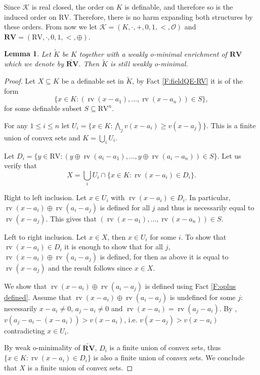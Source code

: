 \documentclass[11pt]{amsart}
\DeclareMathOperator{\rv}{rv}
\newtheorem{lemma}[theorem]{Lemma}
\theoremstyle{definition}
\newcommand{\CK}{{\mathcal K}}
\newcommand{\CO}{{\mathcal O}}
\newcommand{\0}{\emptyset}
\begin{document}
Since $\CK$ is real closed, the order on $K$ is definable, and therefore so is the induced order on $\mathrm{RV}$.  Therefore, there is no harm expanding both structures by these orders. From now we let $\CK=(K,\cdot,+,0,1,<,\CO)$ and $\mathbf{RV}=(\mathrm{RV},\cdot,0,1,<,\oplus)$.


  \begin{lemma}\label{L:Rvwom implies K wom}
      Let $\widetilde K$ be $K$ together with a weakly o-minimal enrichment of $\mathbf{RV}$ which we denote by $\widetilde{\mathbf{RV}}$. Then $\widetilde K$ is still weakly o-minimal.
  \end{lemma}
\begin{proof}
    Let $X\subseteq K$ be a definable set in $\widetilde K$, by Fact \ref{F:fieldQE-RV} it is of the form \[\{x\in K: (\rv(x-a_1),\dots, \rv(x-a_n))\in S\},\] for some definable subset $S\subseteq \mathrm{RV}^n$.

    For any $1\leq i\leq n$ let $U_{i}=\{x\in K: \bigwedge_j v(x-a_{i})\geq v(x-a_j)\}$. This is a finite union of convex sets and $K=\bigcup_i U_i$.
    
    
    Let $D_{i}=\{y\in \mathrm{RV}: (y\oplus \rv(a_{i}-a_1),\dots, y\oplus \rv(a_{i}-a_n))\in S\}$. 
    Let us verify that  
    \[X=\bigcup_{i} U_{i}\cap \{x\in K: \rv(x-a_{i})\in D_{i}\}.\]

    Right to left inclusion. Let $x\in U_i$ with $\rv(x-a_i)\in D_i$. In particular, $\rv(x-a_i)\oplus \rv(a_i-a_j)$ is defined for all $j$ and thus is necessarily equal to $\rv(x-a_j)$. This gives that $(\rv(x-a_1),\dots, \rv(x-a_n))\in S$.
    
    Left to right inclusion. Let $x\in X$, then $x\in U_{i}$ for some $i$. To show that $\rv(x-a_{i})\in D_{i}$ it is enough to show that for all $j$, $\rv(x-a_{i})\oplus \rv(a_i-a_j)$ is defined, for then as above it is equal to $\rv(x-a_j)$ and the result follows since $x\in X.$ 
    
    We show that $\rv(x-a_{i})\oplus \rv(a_i-a_j)$ is defined using Fact \ref{F:oplus defined}. Assume that $\rv(x-a_{i})\oplus \rv(a_i-a_j)$ is undefined for some $j$: necessarily $x- a_{i}\neq 0$, $a_j-a_i\neq 0$ and $\rv(x-a_{i})=\rv(a_{j}-a_i)$. By \cite[Proposition 2.2]{flenner}, $v(a_j-a_i-(x-a_i))>v(x-a_i)$, i.e. $v(x-a_j)>v(x-a_{i})$ contradicting $x\in U_{i}$. 
    
    By weak o-minimality of $\widetilde{\mathbf{RV}}$, $D_{i}$ is a finite union of convex sets, thus $\{x\in K:\rv(x-a_{i})\in D_{i}\}$ is also a finite union of convex sets. We conclude that $X$ is a finite union of convex sets.
\end{proof}
\end{document}
